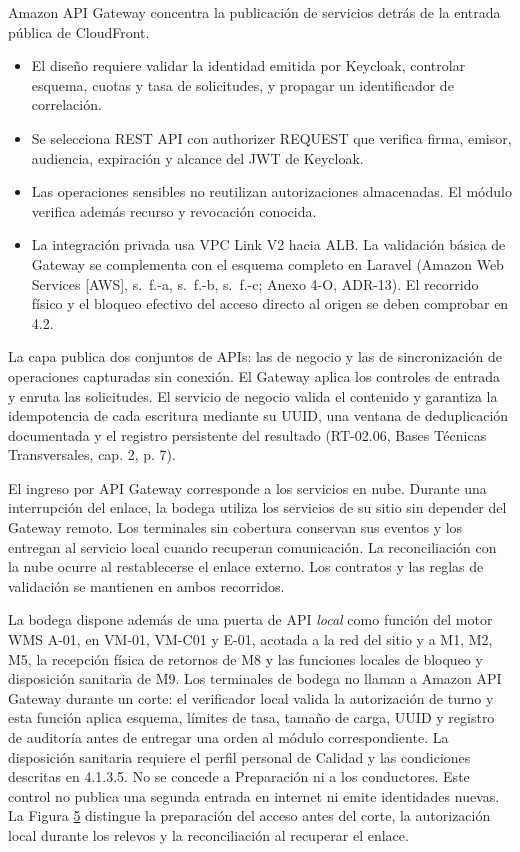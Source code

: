 Amazon API Gateway concentra la publicación de servicios detrás de la entrada pública de CloudFront.

\begin{itemize}
  \item El diseño requiere validar la identidad emitida por Keycloak, controlar esquema, cuotas y tasa de solicitudes, y propagar un identificador de correlación.
  \item Se selecciona REST API con authorizer REQUEST que verifica firma, emisor, audiencia, expiración y alcance del JWT de Keycloak.
  \item Las operaciones sensibles no reutilizan autorizaciones almacenadas. El módulo verifica además recurso y revocación conocida.
  \item La integración privada usa VPC Link V2 hacia ALB. La validación básica de Gateway se complementa con el esquema completo en Laravel (Amazon Web Services [AWS], s.~f.-a, s.~f.-b, s.~f.-c; Anexo 4-O, ADR-13). El recorrido físico y el bloqueo efectivo del acceso directo al origen se deben comprobar en 4.2.
\end{itemize}

La capa publica dos conjuntos de APIs: las de negocio y las de sincronización de operaciones capturadas sin conexión. El Gateway aplica los controles de entrada y enruta las solicitudes. El servicio de negocio valida el contenido y garantiza la idempotencia de cada escritura mediante su UUID, una ventana de deduplicación documentada y el registro persistente del resultado (RT-02.06, Bases Técnicas Transversales, cap. 2, p. 7).

El ingreso por API Gateway corresponde a los servicios en nube. Durante una interrupción del enlace, la bodega utiliza los servicios de su sitio sin depender del Gateway remoto. Los terminales sin cobertura conservan sus eventos y los entregan al servicio local cuando recuperan comunicación. La reconciliación con la nube ocurre al restablecerse el enlace externo. Los contratos y las reglas de validación se mantienen en ambos recorridos.

La bodega dispone además de una puerta de API \emph{local} como función del motor WMS A-01, en VM-01, VM-C01 y E-01, acotada a la red del sitio y a M1, M2, M5, la recepción física de retornos de M8 y las funciones locales de bloqueo y disposición sanitaria de M9. Los terminales de bodega no llaman a Amazon API Gateway durante un corte: el verificador local valida la autorización de turno y esta función aplica esquema, límites de tasa, tamaño de carga, UUID y registro de auditoría antes de entregar una orden al módulo correspondiente. La disposición sanitaria requiere el perfil personal de Calidad y las condiciones descritas en 4.1.3.5. No se concede a Preparación ni a los conductores. Este control no publica una segunda entrada en internet ni emite identidades nuevas. La Figura \hyperref[fig:arql-17]{5} distingue la preparación del acceso antes del corte, la autorización local durante los relevos y la reconciliación al recuperar el enlace.

